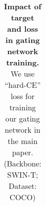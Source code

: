 \begin{table}[!ht]
\begin{minipage}[!hb]{0.495\textwidth}
{\begin{tabular}{llcccccccc}
\bottomrule
\end{tabular}}  
\label{tab:supp_result_backbones}
\end{minipage}
\hfill
\begin{minipage}[!hb]{0.495\textwidth}
\centering
\caption{\textbf{Impact of target and loss in gating network training.} We use ``hard-CE'' loss for training our gating network in the main paper. (Backbone: SWIN-T; Dataset: COCO)}
\label{tab:tgt_loss}
\end{minipage}

\end{table}

